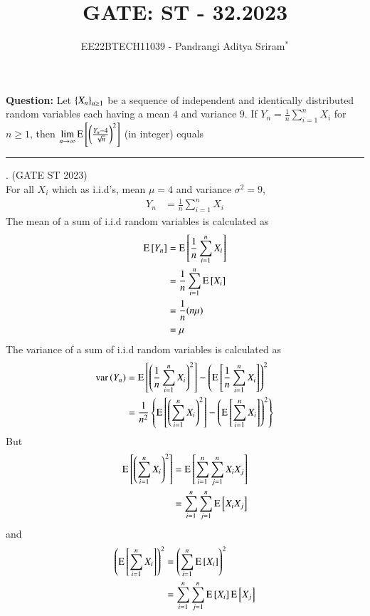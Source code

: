\documentclass[journal,12pt,twocolumn]{IEEEtran}
\theoremstyle{remark}
\begin{document}

\vspace{3cm}

\title{GATE: ST - 32.2023}
\author{EE22BTECH11039 - Pandrangi Aditya Sriram$^{*}$%
}
\maketitle
\newpage
\bigskip

\renewcommand{\thefigure}{\theenumi}
\renewcommand{\thetable}{\theenumi}


\vspace{3cm}
\textbf{Question:} Let $\left\{X_n\right\}_{n \geq 1}$ be a sequence of independent and identically distributed random variables each having a mean $4$ and variance $9$. If $Y_n = \frac{1}{n} \sum_{i=1}^{n} X_i$ for $n \geq 1$, then $\lim\limits_{n \to \infty} \text{E}{}\left[\left(\frac{Y_n - 4}{\sqrt{n}}\right)^2\right]$ (in integer) equals \rule{2cm}{0.1mm}. \hfill(GATE ST 2023)
\\
\solution
For all $X_i$ which as i.i.d's, mean $\mu = 4$ and variance $\sigma^2 = 9$,
\begin{align}
    Y_n &= \frac{1}{n} \sum_{i=1}^{n} X_i
\end{align}
The mean of a sum of i.i.d random variables is calculated as
\begin{align}
    \text{E}{}\left[Y_n\right] &= \text{E}{}\left[\frac{1}{n} \sum_{i=1}^{n} X_i\right]\\
    &= \frac{1}{n} \sum_{i=1}^{n} \text{E}{}\left[X_i\right]\\
    &= \frac{1}{n} (n\mu)\\
    &= \mu
\end{align}
The variance of a sum of i.i.d random variables is calculated as
\begin{align}
    \text{var}\left(Y_n\right) &= \text{E}{}\left[\left(\frac{1}{n} \sum_{i=1}^{n} X_i\right)^2\right] - \left(\text{E}{}\left[\frac{1}{n} \sum_{i=1}^{n} X_i\right]\right)^2\\
    &= \frac{1}{n^2} \left\{\text{E}{}\left[\left(\sum_{i=1}^{n} X_i\right)^2\right] - \left(\text{E}{}\left[\sum_{i=1}^{n} X_i\right]\right)^2\right\}\label{eq:st_32_2023_1}
\end{align}
But
\begin{align}
    \text{E}{}\left[\left(\sum_{i=1}^{n} X_i\right)^2\right] &= \text{E}{}\left[\sum_{i=1}^{n} \sum_{j=1}^{n} X_iX_j\right]\\
    &= \sum_{i=1}^{n} \sum_{j=1}^{n} \text{E}{}\left[X_iX_j\right] \label{eq:st_32_2023_2}
\end{align}
and 
\begin{align}
    \left(\text{E}{}\left[\sum_{i=1}^{n} X_i\right]\right)^2 &= \left(\sum_{i=1}^{n} \text{E}{}\left[X_i\right]\right)^2\\
    &= \sum_{i=1}^{n} \sum_{j=1}^{n} \text{E}{}\left[X_i\right] \text{E}{}\left[X_j\right] \label{eq:st_32_2023_3}
\end{align}
\end{document}
